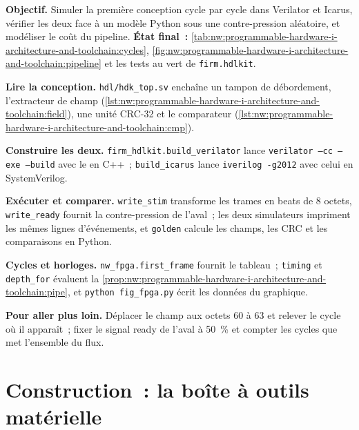 \begin{tutorial}
\textbf{Objectif.} Simuler la première conception cycle par cycle dans Verilator et Icarus, vérifier les deux face à un modèle Python sous une
contre-pression aléatoire, et modéliser le coût du pipeline. \textbf{État final~:} \cref{tab:nw:programmable-hardware-i-architecture-and-toolchain:cycles},
\cref{fig:nw:programmable-hardware-i-architecture-and-toolchain:pipeline} et les tests au vert de \texttt{firm.hdlkit}.
\begin{tutsteps}
\item \textbf{Lire la conception.} \texttt{hdl/hdk\_top.sv} enchaîne un tampon de débordement, l'extracteur de champ
  (\cref{lst:nw:programmable-hardware-i-architecture-and-toolchain:field}), une unité CRC-32 et le comparateur
  (\cref{lst:nw:programmable-hardware-i-architecture-and-toolchain:cmp}).
\item \textbf{Construire les deux.} \texttt{firm\_hdlkit.build\_verilator} lance \texttt{verilator --cc --exe --build} avec le  en C++~;
  \texttt{build\_icarus} lance \texttt{iverilog -g2012} avec celui en SystemVerilog.
\item \textbf{Exécuter et comparer.} \texttt{write\_stim} transforme les trames en beats de 8 octets, \texttt{write\_ready} fournit la
  contre-pression de l'aval~; les deux simulateurs impriment les mêmes lignes d'événements, et \texttt{golden} calcule les champs, les CRC et les comparaisons en Python.
\item \textbf{Cycles et horloges.} \texttt{nw\_fpga.first\_frame} fournit le tableau~; \texttt{timing} et \texttt{depth\_for} évaluent
  la \cref{prop:nw:programmable-hardware-i-architecture-and-toolchain:pipe}, et \texttt{python fig\_fpga.py} écrit les données du graphique.
\end{tutsteps}
\textbf{Pour aller plus loin.} Déplacer le champ aux octets 60 à 63 et relever le cycle où il apparaît~; fixer le signal ready de l'aval à 50~\% et compter
les cycles que met l'ensemble du flux.
\end{tutorial}

\section{Construction~: la boîte à outils matérielle}\label{bld:nw:programmable-hardware-i-architecture-and-toolchain:hdlkit}

